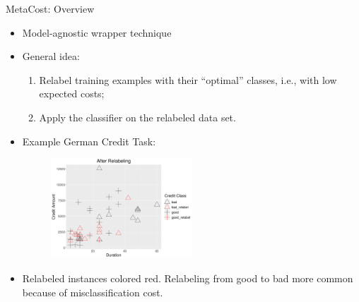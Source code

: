 \documentclass[11pt,compress,t,notes=noshow, xcolor=table]{beamer}
\begin{document}
\begin{vbframe}{MetaCost: Overview}

        \begin{itemize}
        \small
            \item Model-agnostic wrapper technique                      
            \item General idea: 
                \begin{enumerate}
                \small
                    \item Relabel training examples with their ``optimal'' classes, i.e., with low expected costs;
                   
                    \item Apply the classifier on the relabeled data set.
                \end{enumerate} 
                \item Example German Credit Task:
                                \begin{figure}[h]
            \centering
            \includegraphics[width=0.5\textwidth]{figure_man/relabeling_viz.png}
        \end{figure}
                \item Relabeled instances colored red. Relabeling from good to bad more common because of misclassification cost.
        \end{itemize}

\end{vbframe}
\end{document}
